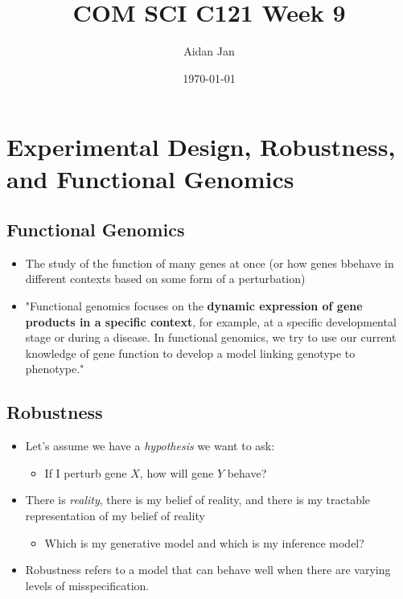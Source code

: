 \documentclass[10pt]{article}
\title{COM SCI C121 Week 9}
\author{Aidan Jan}
\date{\today}
\begin{document}
\maketitle

\section*{Experimental Design, Robustness, and Functional Genomics}
\subsection*{Functional Genomics}
\begin{itemize}
    \item The study of the function of many genes at once (or how genes bbehave in different contexts based on some form of a perturbation)
    \item "Functional genomics focuses on the \textbf{dynamic expression of gene products in a specific context}, for example, at a specific developmental stage or during a disease.  In functional genomics, we try to use our current knowledge of gene function to develop a model linking genotype to phenotype."
\end{itemize}

\subsection*{Robustness}
\begin{itemize}
    \item Let's assume we have a \textit{hypothesis} we want to ask:
    \begin{itemize}
        \item If I perturb gene $X$, how will gene $Y$ behave?
    \end{itemize}
    \item There is \textit{reality}, there is my belief of reality, and there is my tractable representation of my belief of reality
    \begin{itemize}
        \item Which is my generative model and which is my inference model?
    \end{itemize}
    \item Robustness refers to a model that can behave well when there are varying levels of misspecification.
\end{itemize}
\end{document}
